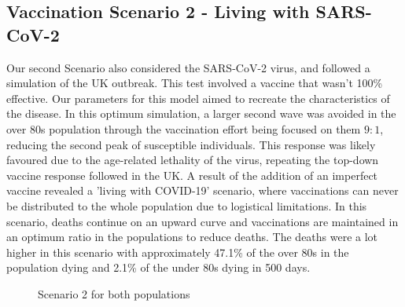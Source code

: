 \documentclass{article}
\begin{document}
\subsection{Vaccination Scenario 2 - Living with SARS-CoV-2}

Our second Scenario also considered the SARS-CoV-2 virus, and followed a simulation of the UK outbreak. This test involved a vaccine that wasn't 100\% effective. Our parameters for this model aimed to recreate the characteristics of the disease. %
\noindent
In this optimum simulation, a larger second wave was avoided in the over 80s population through the vaccination effort being focused on them $9:1$, reducing the second peak of susceptible individuals. This response was likely favoured due to the age-related lethality of the virus, repeating the top-down vaccine response followed in the UK. 
A result of the addition of an imperfect vaccine revealed a 'living with COVID-19' scenario, where vaccinations can never be distributed to the whole population due to logistical limitations. In this scenario, deaths continue on an upward curve and vaccinations are maintained in an optimum ratio in the populations to reduce deaths. The deaths were a lot higher in this scenario with approximately 47.1\% of the over 80s in the population dying and 2.1\% of the under 80s dying in 500 days.


\begin{figure}[ht!]
\hspace{\fill}
\caption{Scenario 2 for both populations}
\end{figure}
\end{document}
